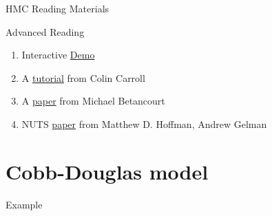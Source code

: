 \documentclass{beamer}
\begin{document}
\begin{frame}{HMC Reading Materials}
    \begin{alertblock}{Advanced Reading}
\begin{enumerate}
    \item Interactive \href{https://chi-feng.github.io/mcmc-demo/app.html}{Demo}
    \item A \href{https://colindcarroll.com/2019/04/11/hamiltonian-monte-carlo-from-scratch/}{tutorial} from Colin Carroll
    \item A \href{https://arxiv.org/abs/1701.02434}{paper} from Michael Betancourt
    \item NUTS \href{https://arxiv.org/abs/1111.4246}{paper} from Matthew D. Hoffman, Andrew Gelman
\end{enumerate}
\end{alertblock}
\end{frame}
\section{Cobb-Douglas model}
\begin{frame}{}
    \centering \Huge Example
\end{frame}
\end{document}
